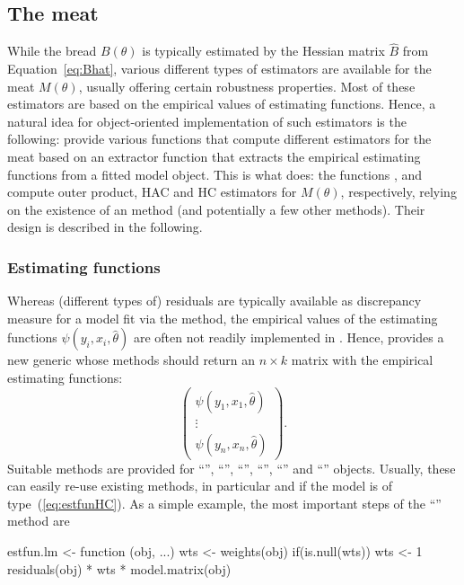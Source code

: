 \documentclass{Z}
\begin{document}
\subsection{The meat}

While the bread $B(\theta)$ is typically estimated by the Hessian matrix $\hat B$ from
Equation~\ref{eq:Bhat}, various different types of estimators are available for the meat
$M(\theta)$, usually offering certain robustness properties. Most of these estimators are
based on the empirical values of estimating functions. Hence, a natural idea
for object-oriented implementation of such estimators is the following: provide various 
functions that compute different estimators for the meat based on an
 extractor function that extracts the empirical estimating functions
from a fitted model object. This is what  does: the functions ,
 and  compute outer product, HAC and HC estimators for
$M(\theta)$, respectively, relying on the existence of an  method (and potentially
a few other methods). Their design is described in the following.

\subsubsection{Estimating functions}

Whereas (different types of) residuals are typically available as discrepancy measure for
a model fit via the  method, the empirical values of the estimating functions
$\psi(y_i, x_i, \hat \theta)$ are often not readily implemented in . Hence,
 provides a new  generic whose methods should return an
$n \times k$ matrix with the empirical estimating functions:
 \[ \left( \begin{array}{c} \psi(y_1, x_1, \hat \theta) \\ \vdots \\ \psi(y_n, x_n, \hat \theta)
    \end{array} \right). \]
Suitable methods are provided for ``'', ``'', ``'', ``'',
``'' and ``'' objects. Usually, these can easily re-use existing
methods, in particular  and  if the model is of
type~(\ref{eq:estfunHC}). As a simple example, the most important steps of the ``''
method are
\begin{Schunk}
\begin{Sinput}
estfun.lm <- function (obj, ...) 
{
  wts <- weights(obj)
  if(is.null(wts)) wts <- 1
  residuals(obj) * wts * model.matrix(obj)
}
\end{Sinput}
\end{Schunk}
\end{document}
